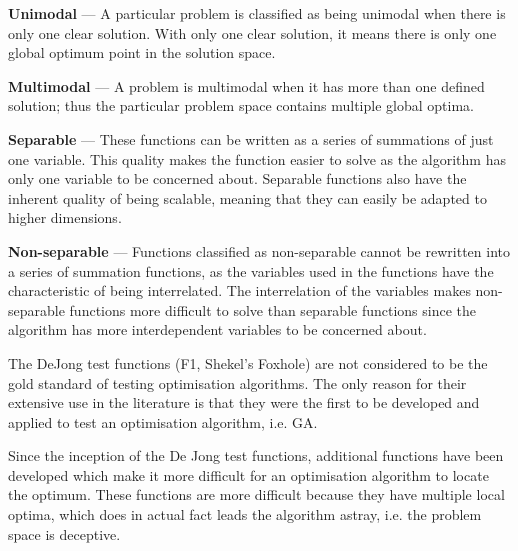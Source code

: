 \begin{description}
\item{\textbf{Unimodal}} --- A particular problem is classified as being unimodal when there is only one clear solution. With only one clear solution, it means there is only one global optimum point in the solution space\cite{evalevoalgo,numericalABC,FundamentalSwarm,CompuIntelligenceIntro}.
\item{\textbf{Multimodal}} --- A problem is multimodal when it has more than one defined solution; thus the particular problem space contains multiple global optima\cite{evalevoalgo,numericalABC,FundamentalSwarm,CompuIntelligenceIntro}.
\item{\textbf{Separable}} --- These functions can be written as a series of summations of just one variable\cite{numericalABC}. This quality makes the function easier to solve as the algorithm has only one variable to be concerned about\cite{evalevoalgo,numericalABC}. Separable functions also have the inherent quality of being scalable, meaning that they can easily be adapted to higher dimensions\cite{evalevoalgo,numericalABC}.
\item{\textbf{Non-separable}} --- Functions classified as non-separable cannot be rewritten into a series of summation functions, as the variables used in the functions have the characteristic of being interrelated\cite{evalevoalgo,numericalABC}. The interrelation of the variables makes non-separable functions more difficult to solve than separable functions since the algorithm has more interdependent variables to be concerned about\cite{evalevoalgo,numericalABC}.
\end{description}

The DeJong test functions (F1, Shekel's Foxhole) are not considered to be the gold standard of testing optimisation algorithms\cite{evalevoalgo}. The only reason for their extensive use in the literature is that they were the first to be developed and applied to test an optimisation algorithm, i.e. GA\cite{devparallelgasa,evalevoalgo}.

Since the inception of the De Jong test functions, additional functions have been developed which make it more difficult for an optimisation algorithm to locate the optimum\cite{evalevoalgo}. These functions are more difficult because they have multiple local optima, which does in actual fact leads the algorithm astray, i.e. the problem space is deceptive\cite{CompuIntelligenceIntro,FundamentalSwarm,evalevoalgo}. 

